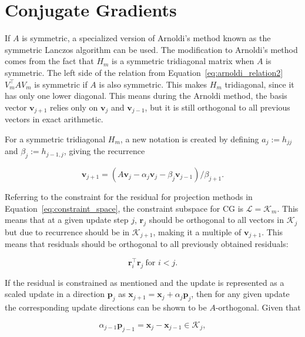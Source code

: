 \section{Conjugate Gradients}
If $A$ is symmetric, a specialized version of Arnoldi's method known as the symmetric Lanczos algorithm can be used. The modification to Arnoldi's method comes from the fact that $H_m$ is a symmetric tridiagonal matrix when $A$ is symmetric. The left side of the relation from Equation~\ref{eq:arnoldi_relation2} $V^\top_m A V_m$ is symmetric if $A$ is also symmetric. This makes $H_m$ tridiagonal, since it has only one lower diagonal. This means during the Arnoldi method, the basis vector $\mathbf{v}_{j+1}$ relies only on $\mathbf{v}_j$ and $\mathbf{v}_{j-1}$, but it is still orthogonal to all previous vectors in exact arithmetic.

For a symmetric tridiagonal $H_m$, a new notation is created by defining $a_j := h_{jj}$ and $\beta_j := h_{j-1, j}$, giving the recurrence

\begin{equation}
    \mathbf{v}_{j+1} = \left(A \mathbf{v}_j - \alpha_j \mathbf{v}_j - \beta_j \mathbf{v}_{j-1}\right)/\beta_{j+1}.
\end{equation}

Referring to the constraint for the residual for projection methods in Equation~\ref{eq:constraint_space}, the constraint subspace for CG is $\mathcal{L} = \mathcal{K}_m$. This means that at a given update step $j$, $\mathbf{r}_j$ should be orthogonal to all vectors in $\mathcal{K}_j$ but due to recurrence should be in $\mathcal{K}_{j+1}$, making it a multiple of $\mathbf{v}_{j+1}$. This means that residuals should be orthogonal to all previously obtained residuals:

\begin{equation}
    \mathbf{r}_i^\top \mathbf{r}_j\ \text{for $i < j$}.
\end{equation}

If the residual is constrained as mentioned and the update is represented as a scaled update in a direction $\mathbf{p}_j$ as $\mathbf{x}_{j+1} = \mathbf{x}_{j} + \alpha_j \mathbf{p}_j$, then for any given update the corresponding update directions can be shown to be $A$-orthogonal. Given that 

\begin{equation}
	\alpha_{j-1}\mathbf{p}_{j-1} = \mathbf{x}_{j} - \mathbf{x}_{j-1} \in \mathcal{K}_j,
\end{equation} 

